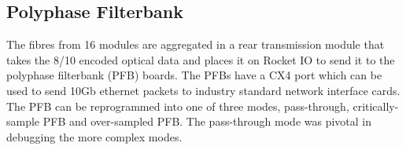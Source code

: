 \subsection{Polyphase Filterbank}
The fibres from 16 modules are aggregated in a rear transmission module that takes the 8/10 encoded optical data and places it on Rocket IO to send it to the polyphase filterbank (PFB) boards. The PFBs have a CX4 port which can be used to send 10Gb ethernet packets to industry standard network interface cards. The PFB can be reprogrammed into one of three modes, pass-through, critically-sample PFB and over-sampled PFB. The pass-through mode was pivotal in debugging the more complex modes.